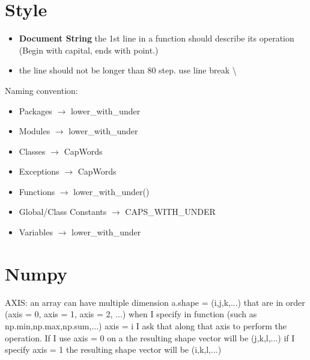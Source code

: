 \documentclass{article}
\begin{document}
\section{Style}
\begin{itemize}
\item \textbf{Document String} the 1st line in a function should describe its operation (Begin with capital, ends with point.) \cite{Google}
\item the line should not be longer than 80 step. use line break \textbackslash
\end{itemize}

Naming convention:
\begin{itemize}
\item Packages $\rightarrow$ lower\_with\_under
\item Modules $\rightarrow$ lower\_with\_under
\item Classes $\rightarrow$ CapWords
\item Exceptions $\rightarrow$ CapWords
\item Functions $\rightarrow$ lower\_with\_under()
\item Global/Class Constants $\rightarrow$ CAPS\_WITH\_UNDER
\item Variables $\rightarrow$ lower\_with\_under
\end{itemize}
\section{Numpy}
AXIS: an array can have multiple dimension a.shape = (i,j,k,...) that are in order (axis = 0, axis = 1, axis = 2, ...)
when I specify in function (such as np.min,np.max,np.sum,...) axis = i I ask that along that axis to perform the operation.
If I use axis = 0 on a the resulting shape vector will be (j,k,l,...) if I specify axis = 1 the resulting shape vector will be (i,k,l,...)
\end{document}
